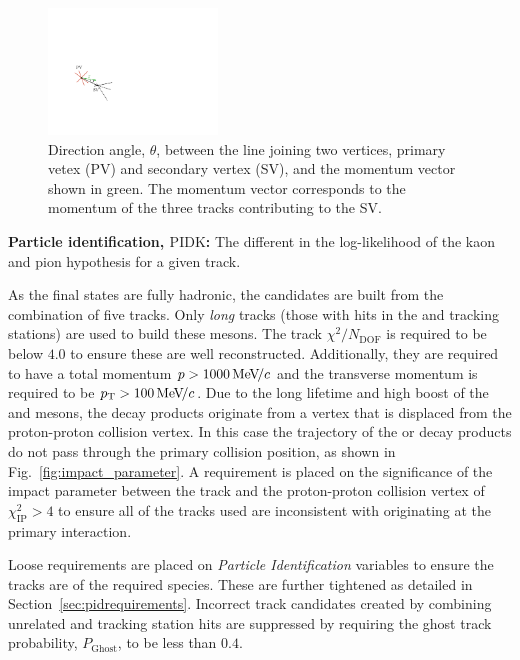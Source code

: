 \begin{description}
\begin{figure}[!h]
    \centering
    \includegraphics[width=0.4\textwidth]{figs/Selection/DIRA.pdf}
    \caption{Direction angle, $\theta$, between the line joining two vertices, primary vetex (PV) and secondary vertex (SV), and the momentum vector shown in green. The momentum vector corresponds to the momentum of the three tracks contributing to the SV. }
    \label{fig:dira}   
\end{figure}


\item \textbf{Particle identification, $\text{PIDK}$:} The different in the log-likelihood of the kaon and pion hypothesis for a given track.  
\end{description}


As the final states are fully hadronic, the candidates are built from the combination of five tracks. Only \emph{long} tracks (those with hits in the \velo and tracking stations) are used to build these mesons. The track $\chi^{2}/N_{\text{DOF}}$ is required to be below $4.0$ to ensure these are well reconstructed. Additionally, they are required to have a total momentum $\mbox{$p$} > 1000 {\mathrm{\,Me\kern -0.1em V\!/}c}$ and the transverse momentum is required to be $\mbox{$p_{\mathrm{ T}}$} > 100 {\mathrm{\,Me\kern -0.1em V\!/}c}$.
Due to the long lifetime and high boost of the \Bp and \D mesons, the decay products originate from a vertex that is displaced from the proton-proton collision vertex. In this case the trajectory of the \B or \D decay products do not pass through the primary collision position, as shown in Fig.~\ref{fig:impact_parameter}. A requirement is placed on the significance of the impact parameter between the track and the proton-proton collision vertex of $\chi^{2}_{\text{IP}} > 4$ to ensure all of the tracks used are inconsistent with originating at the primary interaction.  


Loose requirements are placed on \emph{Particle Identification} variables to ensure the tracks are of the required species. These are further tightened as detailed in Section~\ref{sec:pidrequirements}. Incorrect track candidates created by combining unrelated \velo and tracking station hits are suppressed by requiring the ghost track probability, $P_{\text{Ghost}}$, to be less than $0.4$. 


